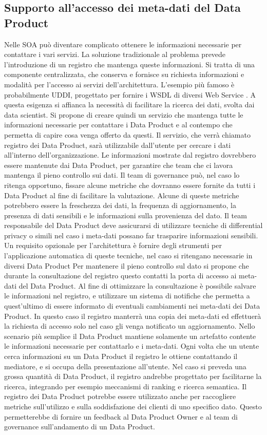 \documentclass[12pt]{report}
\begin{document}
\subsection{Supporto all'accesso dei meta-dati del Data Product}
Nelle SOA può diventare complicato ottenere le informazioni necessarie per contattare i vari servizi.
La soluzione tradizionale al problema prevede l'introduzione di un registro che mantenga queste informazioni. 
Si tratta di una componente centralizzata, che conserva e fornisce su richiesta informazioni e modalità per l'accesso ai servizi dell'architettura.
L'esempio più famoso è probabilmente UDDI, progettato per fornire i WSDL di diversi Web Service \cite{curbera2002unraveling}.
A questa esigenza si affianca la necessità di facilitare  la ricerca dei dati, svolta dai data scientist.
Si propone di creare quindi un servizio che mantenga tutte le informazioni necessarie per contattare i Data Product e al contempo che permetta di capire cosa venga offerto da questi.
Il servizio, che verrà chiamato registro dei Data Product, sarà utilizzabile dall'utente per cercare i dati all'interno dell'organizzazione. 
Le informazioni mostrate dal registro dovrebbero essere mantenute dai Data Product, per garantire che team che ci lavora mantenga il pieno controllo sui dati.
Il team di governance può, nel caso lo ritenga opportuno, fissare alcune metriche che dovranno essere fornite da tutti i Data Product al fine di facilitare la valutazione.
Alcune di queste metriche potrebbero essere la freschezza dei dati, la frequenza di aggiornamento, la presenza di dati sensibili e le informazioni sulla provenienza del dato.
Il team responsabile del Data Product deve assicurarsi di utilizzare tecniche di differential privacy o simili nel caso i meta-dati possano far trasparire informazioni sensibili.
Un requisito opzionale per l'architettura è fornire degli strumenti per l'applicazione automatica di queste tecniche, nel caso si ritengano necessarie in diversi Data Product
Per mantenere il pieno controllo sul dato si propone che durante la consultazione del registro questo contatti la porta di accesso ai meta-dati del Data Product.
Al fine di ottimizzare la consultazione è possibile salvare le informazioni nel registro, e utilizzare un sistema di notifiche che permetta a quest'ultimo di essere informato di eventuali cambiamenti nei meta-dati dei Data Product.
In questo caso il registro manterrà una copia dei meta-dati ed effettuerà la richiesta di accesso solo nel caso gli venga notificato un aggiornamento.
Nello scenario più semplice il Data Product mantiene solamente un artefatto contente le informazioni necessarie per contattarlo e i meta-dati.
Ogni volta che un utente cerca informazioni su un Data Product il registro le ottiene contattando il mediatore, e si occupa della presentazione all'utente.
Nel caso si preveda una grossa quantità di Data Product, il registro andrebbe progettato per facilitarne la ricerca, integrando per esempio meccanismi di ranking e ricerca semantica.
Il registro dei Data Product potrebbe essere utilizzato anche per raccogliere metriche sull'utilizzo e sulla soddisfazione dei clienti di uno specifico dato.
Questo permetterebbe di fornire un feedback al Data Product Owner e al team di governance sull'andamento di un Data Product.
\end{document}
